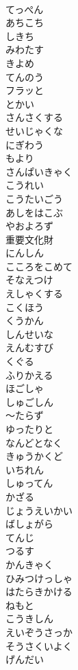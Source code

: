 \documentclass[8pt]{extreport}
\begin{document}
\begin{CJK}{UTF8}{min}
\\	てっぺん
\\	あちこち
\\	しきち
\\	みわたす
\\	きよめ
\\	てんのう
\\	フラッと
\\	とかい
\\	さんさくする
\\	せいじゃくな
\\	にぎわう
\\	もより
\\	さんぱいきゃく
\\	こうれい
\\	こうたいごう
\\	あしをはこぶ
\\	やおよろず
\\	重要文化財
\\	にんしん
\\	こころをこめて
\\	そなえつけ
\\	えしゃくする
\\	こくほう
\\	くうかん
\\	しんせいな
\\	えんむすび
\\	くぐる
\\	ふりかえる
\\	ほごしゃ
\\	しゅごしん
\\	～たらず
\\	ゆったりと
\\	なんどとなく
\\	きゅうかくど
\\	いちれん
\\	しゅってん
\\	かざる
\\	じょうえいかい
\\	ばしょがら
\\	てんじ
\\	つるす
\\	かんきゃく
\\	ひみつけっしゃ
\\	はたらきかける
\\	ねもと
\\	こうきしん
\\	えいぞうさっか
\\	そうさくいよく
\\	げんだい

\end{CJK}
\end{document}
